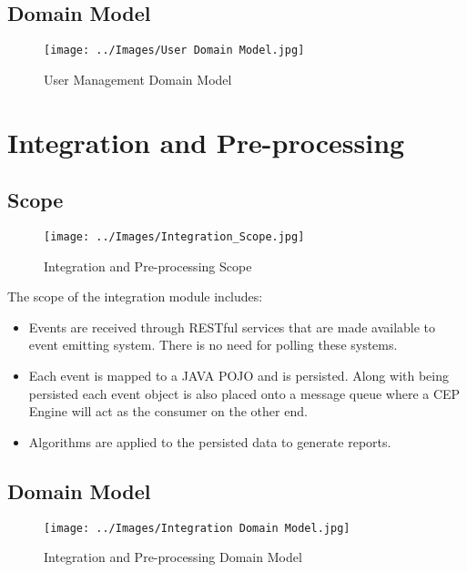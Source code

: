 \documentclass[11pt,a4paper]{article}
\begin{document}
\subsection{Domain Model}
\begin{figure}[H]
	\begin{center}
		\texttt{[image: ../Images/User Domain Model.jpg]}
		\caption{User Management Domain Model}
	\end{center}
\end{figure}

\pagebreak

\section{Integration and Pre-processing}
\subsection{Scope}
\begin{figure}[H]
	\begin{center}
		\texttt{[image: ../Images/Integration\_Scope.jpg]}
		\caption{Integration and Pre-processing Scope}
	\end{center}
\end{figure}
The scope of the integration module includes:
\begin{itemize}
	\item Events are received through RESTful services that are made available to event emitting system. There is no need for polling these systems.
	\item Each event is mapped to a JAVA POJO and is persisted. Along with being persisted each event object is also placed onto a message queue where a CEP Engine will act as the consumer on the other end.
	\item Algorithms are applied to the persisted data to generate reports.
\end{itemize}

\subsection{Domain Model}
\begin{figure}[H]
	\begin{center}
		\texttt{[image: ../Images/Integration Domain Model.jpg]}
		\caption{Integration and Pre-processing Domain Model}
	\end{center}
\end{figure}
\end{document}
